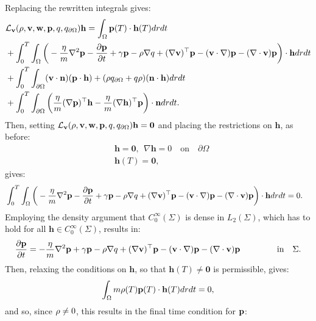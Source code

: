Replacing the rewritten integrals gives:
\begin{align*}
&\mathcal{L}_{\mathbf{v}}(\rho,\mathbf{v},\mathbf{w},\mathbf{p},q,{q}_{\partial \Omega}) \mathbf{h} = \int_\Omega\mathbf{p}(T) \cdot \mathbf{h}(T) dr dt\\
&+\int_0^T \int_\Omega 
\bigg( - \frac{\eta}{m} \nabla^2 \mathbf{p} -   \frac{\partial \mathbf{p}}{\partial t} + \gamma\mathbf{p}-\rho\nabla q +(\nabla \mathbf{v})^\top\mathbf{p} 
- (\mathbf{v} \cdot \nabla)\mathbf{p} -  (\nabla \cdot \mathbf{v})\mathbf{p}   \bigg)\cdot  \mathbf{h} drdt\\
& +\int_0^T \int_{\partial\Omega} (\mathbf{v} \cdot \mathbf{n})(\mathbf{p} \cdot \mathbf{h}) +(\rho  {q}_{\partial \Omega} + q \rho)  (\mathbf{n}\cdot \mathbf{h}) dr dt \\
&+ \int_0^T \int_{\partial \Omega}  \bigg( \frac{\eta}{m}  (\nabla \mathbf{p})^\top \mathbf{h}  - \frac{\eta}{m}(\nabla \mathbf{h})^\top \mathbf{p} \bigg) \cdot \mathbf{n} dr dt.
\end{align*}
Then, setting $\mathcal{L}_{\mathbf{v}}(\rho,\mathbf{v},\mathbf{w},\mathbf{p},q,{q}_{\partial \Omega}) \mathbf{h}=\mathbf{0}$ and placing the restrictions on $\mathbf{h}$, as before:
\begin{align*}
&\mathbf{h}=\mathbf{0}, \ \ \nabla \mathbf{h} = 0 \quad \text{on} \quad \partial \Omega\\
&\mathbf{h}(T)=\mathbf{0},
\end{align*}
gives:
\begin{align*}
&\int_0^T \int_\Omega 
\bigg( - \frac{\eta}{m} \nabla^2 \mathbf{p} -   \frac{\partial \mathbf{p}}{\partial t} + \gamma\mathbf{p}-\rho\nabla q +(\nabla \mathbf{v})^\top\mathbf{p} 
- (\mathbf{v} \cdot \nabla)\mathbf{p} -  (\nabla \cdot \mathbf{v})\mathbf{p}    \bigg)\cdot  \mathbf{h} drdt = 0.
\end{align*}
Employing the density argument that $C_0^\infty(\Sigma)$ is dense in $L_2(\Sigma)$, which has to hold for all $\mathbf{h}\in C_0^\infty(\Sigma)$, results in:
\begin{align*}
   \frac{\partial \Adja}{\partial t} =  - \frac{\eta}{m} \nabla^2 \Adja  + \gamma\Adja-\Sta\nabla \Adjb +(\nabla \Stav)^\top\Adja 
- (\Stav \cdot \nabla)\Adja -  (\nabla \cdot \Stav)\Adja     \ \qquad\qquad \text{in} \quad \Sigma.
\end{align*}
Then, relaxing the conditions on $\mathbf{h}$, so that $\mathbf{h}(T) \neq \mathbf{0} $ is permissible, gives:
\begin{align*}
 \int_\Omega m \rho(T) \mathbf{p}(T) \cdot \mathbf{h}(T) dr dt=0,
\end{align*}
and so, since $\rho \neq 0$, this results in the final time condition for $\mathbf{p}$:

